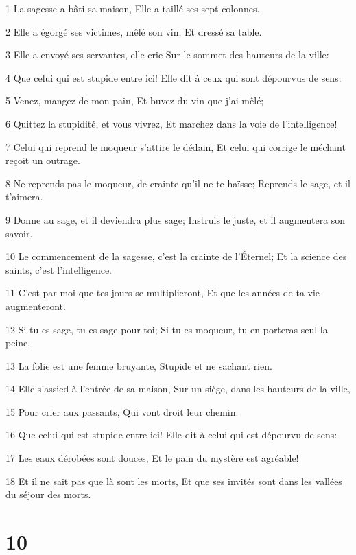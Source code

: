 \par 1 La sagesse a bâti sa maison, Elle a taillé ses sept colonnes.
\par 2 Elle a égorgé ses victimes, mêlé son vin, Et dressé sa table.
\par 3 Elle a envoyé ses servantes, elle crie Sur le sommet des hauteurs de la ville:
\par 4 Que celui qui est stupide entre ici! Elle dit à ceux qui sont dépourvus de sens:
\par 5 Venez, mangez de mon pain, Et buvez du vin que j'ai mêlé;
\par 6 Quittez la stupidité, et vous vivrez, Et marchez dans la voie de l'intelligence!
\par 7 Celui qui reprend le moqueur s'attire le dédain, Et celui qui corrige le méchant reçoit un outrage.
\par 8 Ne reprends pas le moqueur, de crainte qu'il ne te haïsse; Reprends le sage, et il t'aimera.
\par 9 Donne au sage, et il deviendra plus sage; Instruis le juste, et il augmentera son savoir.
\par 10 Le commencement de la sagesse, c'est la crainte de l'Éternel; Et la science des saints, c'est l'intelligence.
\par 11 C'est par moi que tes jours se multiplieront, Et que les années de ta vie augmenteront.
\par 12 Si tu es sage, tu es sage pour toi; Si tu es moqueur, tu en porteras seul la peine.
\par 13 La folie est une femme bruyante, Stupide et ne sachant rien.
\par 14 Elle s'assied à l'entrée de sa maison, Sur un siège, dans les hauteurs de la ville,
\par 15 Pour crier aux passants, Qui vont droit leur chemin:
\par 16 Que celui qui est stupide entre ici! Elle dit à celui qui est dépourvu de sens:
\par 17 Les eaux dérobées sont douces, Et le pain du mystère est agréable!
\par 18 Et il ne sait pas que là sont les morts, Et que ses invités sont dans les vallées du séjour des morts.

\chapter{10}

